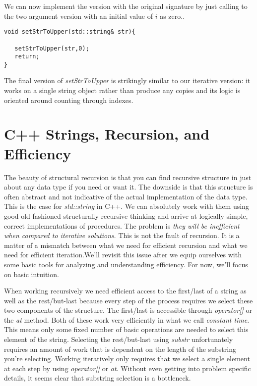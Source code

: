 \documentclass[]{tufte-handout}
\begin{document}
We can now implement the version with the original signature by just calling to the two argument version with an initial value of $i$ as zero..
\begin{verbatim}
void setStrToUpper(std::string& str){

   setStrToUpper(str,0);
   return;
}
\end{verbatim}

The final version of \textit{setStrToUpper} is strikingly similar to our iterative version:  it works on a single string object rather than produce any copies and its logic is oriented around counting through indexes.  

\section{C++ Strings, Recursion, and Efficiency}

The beauty of structural recursion is that you can find recursive structure in just about any data type if you need or want it. The downside is that this structure is often abstract and not indicative of the actual implementation of the data type. This is the case for \textit{std::string} in C++.  We can absolutely work with them using good old fashioned structurally recursive thinking and arrive at logically simple, correct implementations of procedures.  The problem is \textit{they will be inefficient when compared to iterative solutions}. This is not the fault of recursion. It is a matter of a mismatch between what we need for efficient recursion and what we need for efficient iteration.We'll revisit this issue after we equip ourselves with some basic tools for analyzing and understanding efficiency.  For now, we'll focus on basic intuition. 

When working recursively we need efficient access to the first/last of a string as well as the rest/but-last because every step of the process requires we select these two components of the structure. The first/last is accessible through \textit{operator[]} or the \textit{at} method. Both of these work very efficiently in what we call \textit{constant time}.  This means only some fixed number of basic operations are needed to select this element of the string. Selecting the rest/but-last using \textit{substr} unfortunately requires an amount of work that is dependent on the length of the substring you're selecting. Working iteratively only requires that we select a single element at each step by using \textit{operator[]} or \textit{at}. Without even getting into problem specific details, it seems clear that substring selection is a bottleneck. 
\end{document}

